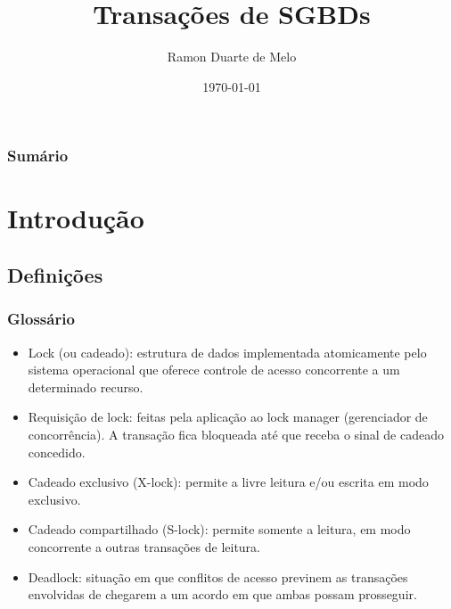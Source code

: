 \documentclass{beamer}
\title[Transações]{Transações de SGBDs} %
\author{Ramon Duarte de Melo} %
\institute[UFRJ] %
{
Universidade Federal do Rio de Janeiro \\ %
\medskip
\textit{ramonduarte@poli.ufrj.br} %
}
\date{\today} %
\begin{document}
\begin{frame}
\titlepage %
\end{frame}

\begin{frame}
\frametitle{Sumário} %
\tableofcontents %
\end{frame}


\section{Introdução} %

\subsection{Definições} %

\begin{frame}
\frametitle{Glossário}
\begin{itemize}
    \item Lock (ou cadeado): estrutura de dados implementada atomicamente pelo sistema operacional que oferece controle de acesso concorrente a um determinado recurso.
    \item Requisição de lock: feitas pela aplicação ao lock manager (gerenciador de concorrência). A transação fica bloqueada até que receba o sinal de cadeado concedido.
    \item Cadeado exclusivo (X-lock): permite a livre leitura e/ou escrita em modo exclusivo.
    \item Cadeado compartilhado (S-lock): permite somente a leitura, em modo concorrente a outras transações de leitura.
    \item Deadlock: situação em que conflitos de acesso previnem as transações envolvidas de chegarem a um acordo em que ambas possam prosseguir.
\end{itemize}
\end{frame}
\end{document}
